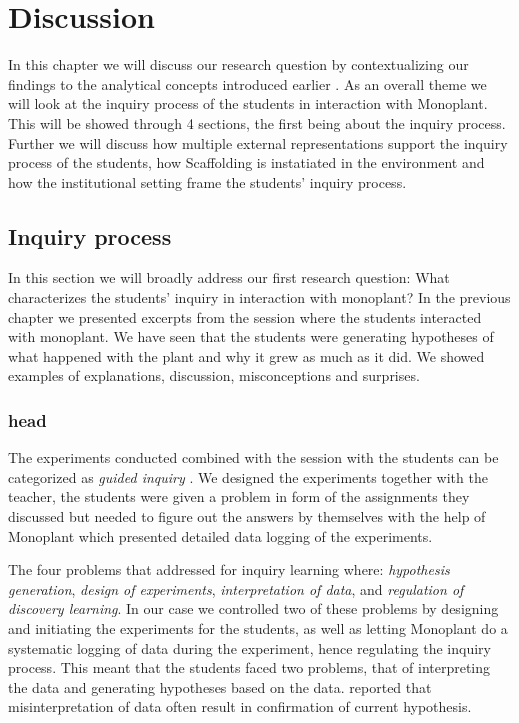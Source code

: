 \chapter{Discussion}
In this chapter we will discuss our research question by contextualizing our findings to the analytical concepts introduced earlier . As an overall theme we will look at the inquiry process of the students in interaction with Monoplant. This will be showed through 4 sections, the first being about the inquiry process. Further we will discuss how multiple external representations support the inquiry process of the students, how Scaffolding is instatiated in the environment and how the institutional setting frame the students' inquiry process.

\section{Inquiry process}
In this section we will broadly address our first research question: What characterizes the students’ inquiry in interaction with monoplant? 
In the previous chapter we presented excerpts from the session where the students interacted with monoplant. We have seen that the students were generating hypotheses of what happened with the plant and why it grew as much as it did. We showed examples of explanations, discussion, misconceptions and surprises.

\subsection{head}
The experiments conducted combined with the session with the students can be categorized as \emph{guided inquiry} \citeauthor*{staver1987analysis} \citetext{\citeyear{staver1987analysis}, referenced in \citealp{prince2006inductive}}. We designed the experiments together with the teacher, the students were given a problem in form of the assignments they discussed but needed to figure out the answers by themselves with the help of Monoplant which presented detailed data logging of the experiments.

The four problems that \citet{de1998scientific} addressed for inquiry learning where: \textit{hypothesis generation}, \textit{design of experiments}, \textit{interpretation of data}, and \textit{regulation of discovery learning}. In our case we controlled two of these problems by designing and initiating the experiments for the students, as well as letting Monoplant do a systematic logging of data during the experiment, hence regulating the inquiry process. This meant that the students faced two problems, that of interpreting the data and generating hypotheses based on the data. \citeauthor*{klahr1993heuristics} \citetext{\citeyear{klahr1993heuristics}, referenced in \citealp{de1998scientific}} reported that misinterpretation of data often result in confirmation of current hypothesis. 

